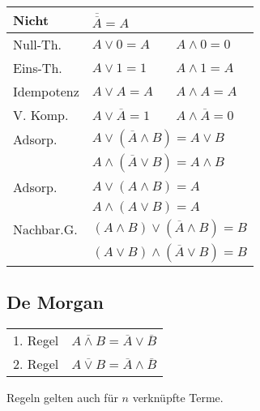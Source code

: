\begin{flushleft}
    \renewcommand{\arraystretch}{1.5}
    \begin{tabular}{l l l}
        Nicht & $\overline{\overline{A}} = A$ & \\
        \hline
        Null-Th. & $A \lor 0 = A$ & $A \land 0 = 0$\\
        \hline
        Eins-Th. & $A \lor 1 = 1$ & $A \land 1 = A$\\
        \hline
        Idempotenz & $A \lor A = A$ & $A \land A = A$\\
        \hline
        V. Komp. & $A \lor \overline{A} = 1$ & $A \land \overline{A} = 0$\\
        \hline
        Adsorp. & \multicolumn{2}{l}{$A \lor (\overline{A} \land B) = A \lor B$}\\
        & \multicolumn{2}{l}{$A \land (\overline{A} \lor B) = A \land B$}\\
        \hline
        Adsorp. & \multicolumn{2}{l}{$A \lor (A \land B) = A$}\\
        & \multicolumn{2}{l}{$A \land (A \lor B) = A$}\\
        \hline
        Nachbar.G. & \multicolumn{2}{l}{$(A \land B) \lor (\overline{A} \land B) = B$}\\
        & \multicolumn{2}{l}{$(A \lor B) \land (\overline{A} \lor B) = B$}
    \end{tabular}
\end{flushleft}

\subsection{De Morgan}
\begin{flushleft}
    \renewcommand{\arraystretch}{1.5}
    \begin{tabular}{l l}
        1. Regel & $\overline{A \land B} = \overline{A} \lor \overline{B}$\\
        2. Regel & $\overline{A \lor B} = \overline{A} \land \overline{B}$\\
    \end{tabular}
\end{flushleft}
Regeln gelten auch für $n$ verknüpfte Terme.

